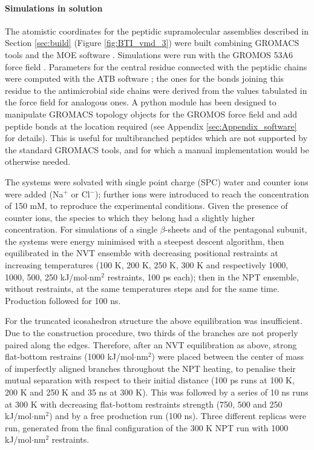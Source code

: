 \paragraph{Simulations in solution} The atomistic coordinates for the peptidic supramolecular assemblies described in Section \ref{sec:build} (Figure \ref{fig:BTI_vmd_3}) were built combining GROMACS tools and the MOE software \citep{moe}.
%
Simulations were run with the GROMOS 53A6 force field \citep{Oostenbrink2004}. Parameters for the central residue connected with the peptidic chains were computed with the ATB software \citep{Malde2011, Koziara2014}; the ones for the bonds joining this residue to the antimicrobial side chains were derived from the values tabulated in the force field for analogous ones.
%
A python module has been designed to manipulate GROMACS topology objects for the GROMOS force field and add peptide bonds at the location required (see Appendix \ref{sec:Appendix_software} for details). This is useful for multibranched peptides which are not supported by the standard GROMACS tools, and for which a manual implementation would be otherwise needed.

The systems were solvated with single point charge (SPC) water \citep{Berendsen1981} and counter ions were added (Na$^+$ or Cl$^-$); further ions were introduced to reach the concentration of 150 mM, to reproduce the experimental conditions. Given the presence of counter ions, the species to which they belong had a slightly higher concentration.
%
For simulations of a single $\beta$-sheets and of the pentagonal subunit, the systems were energy minimised with a steepest descent algorithm, then equilibrated in the NVT ensemble with decreasing positional restraints at increasing temperatures (100 K, 200 K, 250 K, 300 K and respectively 1000, 1000, 500, 250 kJ/mol$\cdot$nm$^2$ restraints, 100 ps each); then in the NPT ensemble, without restraints, at the same temperatures steps and for the same time. Production followed for 100 ns.

For the truncated icosahedron structure the above equilibration was insufficient. Due to the construction procedure, two thirds of the branches are not properly paired along the edges.
%
Therefore, after an NVT equilibration as above, strong flat-bottom restrains (1000 kJ/mol$\cdot$nm$^2$) were placed between the center of mass of imperfectly aligned branches throughout the NPT heating, to penalise their mutual separation with respect to their initial distance (100 ps runs at 100 K, 200 K and 250 K and 35 ns at 300 K).
%
This was followed by a series of 10 ns runs at 300 K with decreasing flat-bottom restraints strength (750, 500 and 250 kJ/mol$\cdot$nm$^2$) and by a free production run (100 ns).
%
Three different replicas were run, generated from the final configuration of the 300 K NPT run with 1000 kJ/mol$\cdot$nm$^2$ restraints.

